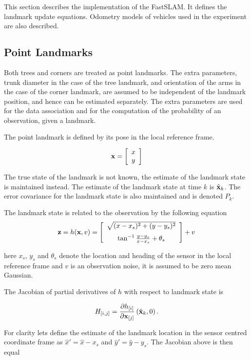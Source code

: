 This section describes the implementation of the FastSLAM. It defines
the landmark update equations. Odometry models of vehicles used in the
experiment are also described.


\subsection{Point Landmarks}

Both trees and corners are treated as point landmarks. The extra
parameters, trunk diameter in the case of the tree landmark, and
orientation of the arms in the case of the corner landmark, are
assumed to be independent of the landmark position, and hence can be
estimated separately. The extra parameters are used for the data
association and for the computation of the probability of an
observation, given a landmark.

The point landmark is defined by its pose in the local reference
frame.

$$
{\bf x} = \left[ \begin{array}{c} x\\y \end{array} \right]
$$

The true state of the landmark is not known, the estimate of the landmark
state is maintained instead. The estimate of the landmark state at
time $k$ is $\hat{\bf x}_k$. The error covariance for the landmark
state is also maintained and is denoted $P_k$.

The landmark state is related to the observation by the following equation
$$
  {\bf z} = h({\bf x},v) = \left[
\begin{array}{c}
\sqrt{(x-x_s)^2 + (y-y_s)^2}\\ \noalign{\medskip}
\tan^{-1} \frac{y-y_s}{x-x_s} + \theta_s
\end{array}
\right] + v
$$

here $x_s$, $y_s$ and $\theta_s$ denote the location and heading of
the sensor in the local reference frame and $v$ is an observation noise,
it is assumed to be zero mean Gaussian.

The Jacobian of partial derivatives of $h$ with respect to landmark
state is

$$
H_{[i,j]} = \frac{\partial h_{[i]}}{\partial {\bf x}_{[j]}}
             \left(\hat{\bf x}_k , 0 \right).
$$

For clarity lets define the estimate of the landmark location in the
sensor centred coordinate frame as $\hat{x}' = \hat{x} - x_s$ and
$\hat{y}' = \hat{y} - y_s$. The Jacobian above is then equal

